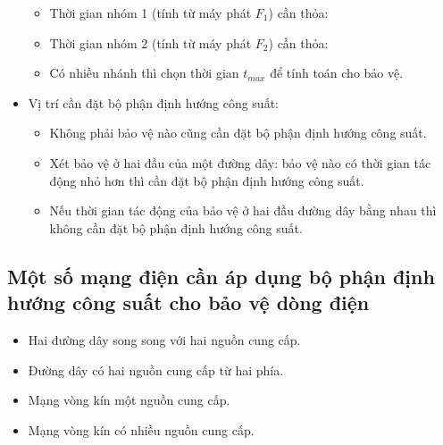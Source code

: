 \documentclass[12pt,a4paper]{article}
\begin{document}
\begin{itemize}
			\begin{itemize}
				\item Thời gian nhóm 1 (tính từ máy phát $F_1$) cần thỏa:
				
				\item Thời gian nhóm 2 (tính từ máy phát $F_2$) cần thỏa:
				\item Có nhiều nhánh thì chọn thời gian $t_{max}$ để tính toán cho bảo vệ.
			\end{itemize}
		\item Vị trí cần đặt bộ phận định hướng công suất:
			\begin{itemize}
				\item Không phải bảo vệ nào cũng cần đặt bộ phận định hướng công suất.
				\item  Xét bảo vệ ở hai đầu của một đường dây: bảo vệ nào có thời gian tác động nhỏ hơn thì cần đặt bộ phận định hướng công suất.
				\item Nếu thời gian tác động của bảo vệ ở hai đầu đường dây bằng nhau thì không cần đặt bộ phận định hướng công suất.
			\end{itemize}		
	\end{itemize}
	
\subsection{Một số mạng điện cần áp dụng bộ phận định hướng công suất cho bảo vệ dòng điện}
	\begin{itemize}
		\item Hai đường dây song song với hai nguồn cung cấp.
		
		\item Đường dây có hai nguồn cung cấp từ hai phía.
		
		\item Mạng vòng kín một nguồn cung cấp.
		
		\item Mạng vòng kín có nhiều nguồn cung cấp.
	\end{itemize}
	
\end{document}
